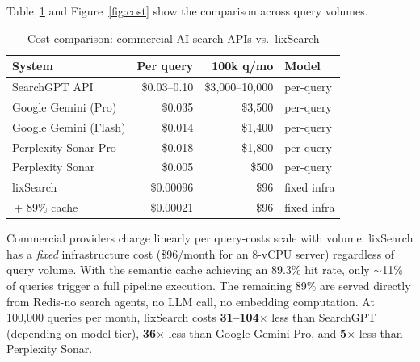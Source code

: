 \documentclass[conference]{IEEEtran}
\begin{document}
Table~\ref{tab:cost} and Figure~\ref{fig:cost} show the comparison across query volumes.

\begin{table}[h]
\centering
\caption{Cost comparison: commercial AI search APIs vs.\ lixSearch}
\label{tab:cost}
{\scriptsize
\begin{tabular}{@{}lrrl@{}}
\toprule
\textbf{System} & \textbf{Per query} & \textbf{100k q/mo} & \textbf{Model} \\
\midrule
SearchGPT API & \$0.03--0.10 & \$3{,}000--10{,}000 & per-query \\
Google Gemini (Pro) & \$0.035 & \$3{,}500 & per-query \\
Google Gemini (Flash) & \$0.014 & \$1{,}400 & per-query \\
Perplexity Sonar Pro & \$0.018 & \$1{,}800 & per-query \\
Perplexity Sonar & \$0.005 & \$500 & per-query \\
\midrule
lixSearch & \$0.00096 & \$96 & fixed infra \\
\,+ 89\% cache & \$0.00021 & \$96 & fixed infra \\
\bottomrule
\end{tabular}}
\end{table}

Commercial providers charge linearly per query-costs scale with volume. lixSearch has a \emph{fixed} infrastructure cost (\$96/month for an 8-vCPU server) regardless of query volume. With the semantic cache achieving an 89.3\% hit rate, only ${\sim}$11\% of queries trigger a full pipeline execution. The remaining 89\% are served directly from Redis-no search agents, no LLM call, no embedding computation. At 100{,}000 queries per month, lixSearch costs \textbf{31--104$\times$} less than SearchGPT (depending on model tier), \textbf{36$\times$} less than Google Gemini Pro, and \textbf{5$\times$} less than Perplexity Sonar.
\end{document}
